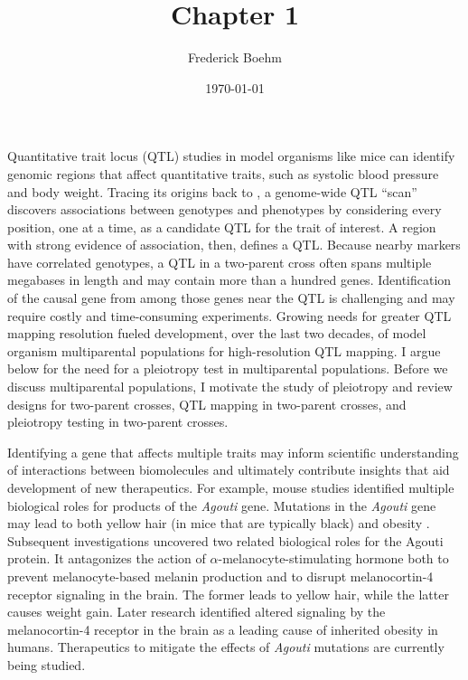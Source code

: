 \documentclass[]{article}\usepackage[]{graphicx}\usepackage[]{color}
\title{Chapter 1}
\author{Frederick Boehm}
\date{\today}
\begin{document}
\doublespacing
\maketitle

\listoftodos
\listoffigures
\listoftables



Quantitative trait locus (QTL) studies in model organisms like mice can identify 
genomic regions that affect quantitative traits, such as systolic blood pressure and body weight.
Tracing its origins back to \citet{sax1923association}, a genome-wide QTL ``scan'' discovers
associations between genotypes and phenotypes by considering every position, one at a time, as a candidate QTL for the trait of interest.
A region with strong evidence of association, then, defines a QTL. Because nearby markers have correlated
genotypes, a QTL in a two-parent cross often spans multiple megabases in length and may contain more than a hundred genes.
Identification of the causal gene from among those genes near the QTL is challenging and may require costly and time-consuming experiments. 
Growing needs for greater QTL mapping resolution fueled development, over the last two decades, of model organism multiparental populations for high-resolution QTL mapping. I argue below for the need for a pleiotropy test in multiparental populations. Before we discuss multiparental populations, I motivate the study of pleiotropy and review designs for two-parent crosses, QTL mapping in two-parent crosses, and pleiotropy testing in two-parent crosses. 





Identifying a gene that affects multiple traits may inform scientific understanding of
interactions between biomolecules and ultimately contribute insights that aid development
of new therapeutics. 
For example, mouse studies identified multiple biological roles for products of 
the \emph{Agouti} gene. Mutations in the \emph{Agouti} gene may lead to both 
yellow hair (in mice that are typically black) and obesity \citep{attie2017how}.
Subsequent investigations uncovered two related biological roles for the Agouti protein.
It antagonizes the action of $\alpha$-melanocyte-stimulating hormone both to
prevent melanocyte-based melanin production and to disrupt melanocortin-4 receptor signaling in the brain.
The former leads to yellow hair, while the latter causes weight gain.
Later research identified altered signaling by the melanocortin-4 receptor in the brain as a leading cause of inherited obesity in humans.
Therapeutics to mitigate the effects of \emph{Agouti} mutations are currently being studied.
\end{document}
